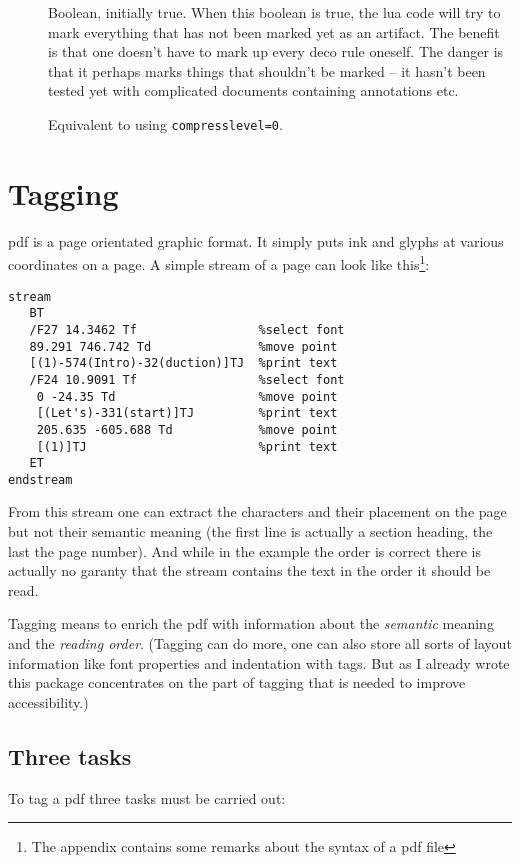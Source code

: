 \documentclass[DIV=12,parskip=half-,bibliography=totoc]{scrartcl}
\begin{document}
\begin{description}
\item[] Boolean, initially true. When this boolean is true, the lua code will try to mark everything that has not been marked yet as an artifact. The benefit is that one doesn't have to mark up every deco rule oneself. The danger is that it perhaps marks things that shouldn't be marked -- it hasn't been tested yet with complicated documents containing annotations etc.
\item[] Equivalent to using \texttt{compresslevel=0}.
    

\end{description}

\section{Tagging}

pdf is a page orientated graphic format. It simply puts ink and glyphs at various coordinates on a page. A simple stream of a page can look like this\footnote{The appendix contains some remarks about the syntax of a pdf file}:

\begin{lstlisting}[columns=fixed]
stream
   BT
   /F27 14.3462 Tf                 %select font
   89.291 746.742 Td               %move point
   [(1)-574(Intro)-32(duction)]TJ  %print text
   /F24 10.9091 Tf                 %select font
    0 -24.35 Td                    %move point
    [(Let's)-331(start)]TJ         %print text
    205.635 -605.688 Td            %move point
    [(1)]TJ                        %print text
   ET
endstream
\end{lstlisting}

From this stream one can extract the characters and their placement on the page but not their semantic meaning  (the first line is actually a section heading, the last the page number). And while in the example the order is correct there is actually no garanty that the stream contains the text in the order it should be read.

Tagging means to enrich the pdf with information about the \emph{semantic} meaning and the \emph{reading order}. (Tagging can do more, one can also store all sorts of layout information like font properties and indentation with tags. But as I already wrote this package concentrates on the part of tagging that is needed to improve accessibility.)



\subsection{Three tasks}
To tag a pdf three tasks must be  carried out:
\end{document}
